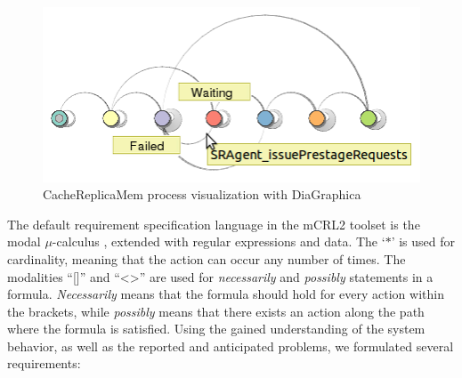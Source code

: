\documentclass[10pt,conference]{IEEEtran}
\begin{document}
\begin{figure}[t]
\includegraphics[width=0.9\linewidth,keepaspectratio=true]{./DiaGraphica.png}
\centering
\caption{CacheReplicaMem process visualization with DiaGraphica}
\label{fig:DiaGraphica}
\end{figure}


The default requirement specification language in the mCRL2 toolset
is the modal $\mu$-calculus \cite{ProcessesWithData}, extended with regular expressions and data.
The `$\ast$' is used for cardinality,
meaning that the action can occur any number of times. The modalities ``[]''
and ``\textless\textgreater'' are used for \textit{necessarily} and 
\textit{possibly} statements in a formula. \textit{Necessarily} means that
the formula should hold for every action within the brackets, while
\textit{possibly} means that there exists an action along the path where
the formula is satisfied. Using the gained understanding of the system behavior, as well as the 
reported and anticipated problems, we formulated several requirements:

\end{document}
